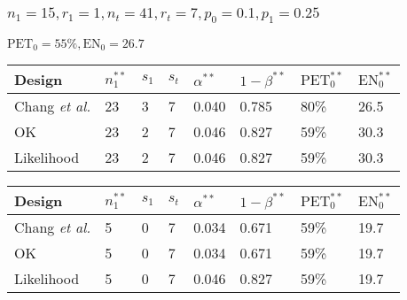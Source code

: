 \documentclass{beamer}\usepackage[]{graphicx}\usepackage[]{color}
\begin{document}
\begin{frame}
\frametitle{$n_1=15, r_1=1, n_t=41, r_t=7, p_0 = 0.1, p_1 = 0.25$}
$\mbox{PET}_0 = 55\%, \mbox{EN}_0 = 26.7$
\begin{table}[]
\begin{tabular}{llllllll}
Design                  & $n_1^{\ast\ast}$ & $s_1$ & $s_t$ & $\alpha^{\ast\ast}$ & $1-\beta^{\ast\ast}$ & $\mbox{PET}^{\ast\ast}_0$ & $\mbox{EN}^{\ast\ast}_0$ \\ \hline
Chang \textit{et al.}  & 23               & 3     & 7     & 0.040                                 & 0.785                & 80\%                      & 26.5                     \\
OK                      & 23               & 2     & 7     & 0.046                                 & 0.827                & 59\%                      & 30.3                     \\
Likelihood              & 23               & 2     & 7     & 0.046                                 & 0.827                & 59\%                      & 30.3                    
\end{tabular}
\end{table}

\begin{table}[]
\begin{tabular}{llllllll}
Design                  & $n_1^{\ast\ast}$ & $s_1$ & $s_t$ & $\alpha^{\ast\ast}$ & $1-\beta^{\ast\ast}$ & $\mbox{PET}^{\ast\ast}_0$ & $\mbox{EN}^{\ast\ast}_0$ \\ \hline
Chang \textit{et al.}  & 5               & 0     & 7     & 0.034                                 & 0.671                & 59\%                      & 19.7                     \\
OK                      & 5               & 0     & 7     & 0.034                                 & 0.671                & 59\%                      & 19.7                     \\
Likelihood              & 5               & 0     & 7     & 0.046                                 & 0.827                & 59\%                      & 19.7                    
\end{tabular}
\end{table}

\end{frame}
\end{document}
